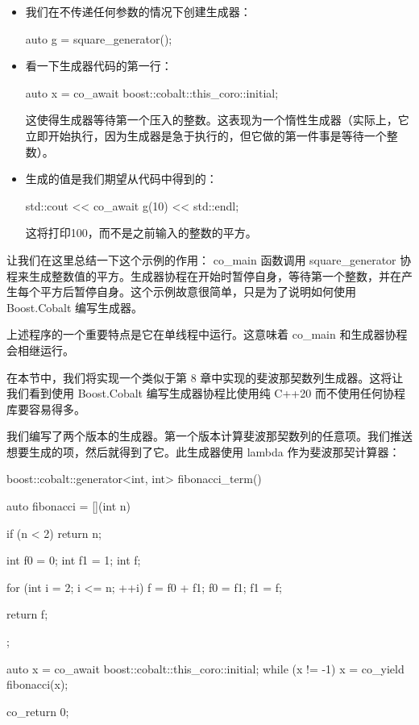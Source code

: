 \begin{itemize}
\item
我们在不传递任何参数的情况下创建生成器：

\begin{cpp}
auto g = square_generator();
\end{cpp}

\item
看一下生成器代码的第一行：

\begin{cpp}
auto x = co_await boost::cobalt::this_coro::initial;
\end{cpp}

这使得生成器等待第一个压入的整数。这表现为一个惰性生成器（实际上，它立即开始执行，因为生成器是急于执行的，但它做的第一件事是等待一个整数）。

\item
生成的值是我们期望从代码中得到的：

\begin{cpp}
std::cout << co_await g(10) << std::endl;
\end{cpp}

这将打印100，而不是之前输入的整数的平方。
\end{itemize}

让我们在这里总结一下这个示例的作用： co\_main 函数调用 square\_generator 协程来生成整数值的平方。生成器协程在开始时暂停自身，等待第一个整数，并在产生每个平方后暂停自身。这个示例故意很简单，只是为了说明如何使用 Boost.Cobalt 编写生成器。

上述程序的一个重要特点是它在单线程中运行。这意味着 co\_main 和生成器协程会相继运行。


在本节中，我们将实现一个类似于第 8 章中实现的斐波那契数列生成器。这将让我们看到使用 Boost.Cobalt 编写生成器协程比使用纯 C++20 而不使用任何协程库要容易得多。

我们编写了两个版本的生成器。第一个版本计算斐波那契数列的任意项。我们推送想要生成的项，然后就得到了它。此生成器使用 lambda 作为斐波那契计算器：

\begin{cpp}
boost::cobalt::generator<int, int> fibonacci_term() {
    auto fibonacci = [](int n) {
        if (n < 2) {
            return n;
        }

        int f0 = 0;
        int f1 = 1;
        int f;

        for (int i = 2; i <= n; ++i) {
            f = f0 + f1;
            f0 = f1;
            f1 = f;
        }

        return f;
    };

    auto x = co_await boost::cobalt::this_coro::initial;
    while (x != -1) {
        x = co_yield fibonacci(x);
    }

    co_return 0;
}
\end{cpp}

